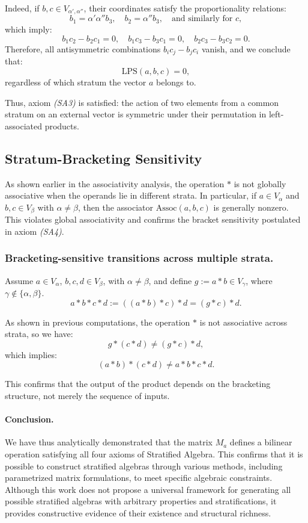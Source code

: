 \documentclass[12pt]{article}
\theoremstyle{definition}
\theoremstyle{plain}
\theoremstyle{remark}
\begin{document}
Indeed, if \( b, c \in V_{\alpha', \alpha''} \), their coordinates satisfy the proportionality relations:
\[
b_1 = \alpha' \alpha'' b_3, \quad b_2 = \alpha'' b_3, \quad \text{and similarly for } c,
\]
which imply:
\[
b_1 c_2 - b_2 c_1 = 0, \quad b_1 c_3 - b_3 c_1 = 0, \quad b_2 c_3 - b_3 c_2 = 0.
\]
Therefore, all antisymmetric combinations \( b_i c_j - b_j c_i \) vanish, and we conclude that:
\[
\mathrm{LPS}(a, b, c) = 0,
\]
regardless of which stratum the vector \( a \) belongs to.

Thus, axiom \emph{(SA3)} is satisfied: the action of two elements from a common stratum on an external vector is symmetric under their permutation in left-associated products.

\subsection{Stratum-Bracketing Sensitivity}

As shown earlier in the associativity analysis, the operation \( * \) is not globally associative when the operands lie in different strata. In particular, if \( a \in V_\alpha \) and \( b, c \in V_\beta \) with \( \alpha \ne \beta \), then the associator \( \mathrm{Assoc}(a, b, c) \) is generally nonzero. This violates global associativity and confirms the bracket sensitivity postulated in axiom \emph{(SA4)}.

\subsubsection{Bracketing-sensitive transitions across multiple strata.}

Assume \( a \in V_\alpha \), \( b, c, d \in V_\beta \), with \( \alpha \ne \beta \), and define \( g := a * b \in V_\gamma \), where \( \gamma \notin \{ \alpha, \beta \} \).
\[
a * b * c * d := ((a * b) * c) * d = (g * c) * d.
\]

As shown in previous computations, the operation \( * \) is not associative across strata, so we have:
\[
g * (c * d) \ne (g * c) * d,
\]
which implies:
\[
(a * b) * (c * d) \ne a * b * c * d.
\]

This confirms that the output of the product depends on the bracketing structure, not merely the sequence of inputs.

\paragraph{Conclusion.}
We have thus analytically demonstrated that the matrix \( M_a \) defines a bilinear operation satisfying all four axioms of Stratified Algebra. This confirms that it is possible to construct stratified algebras through various methods, including parametrized matrix formulations, to meet specific algebraic constraints. Although this work does not propose a universal framework for generating all possible stratified algebras with arbitrary properties and stratifications, it provides constructive evidence of their existence and structural richness.
\end{document}
